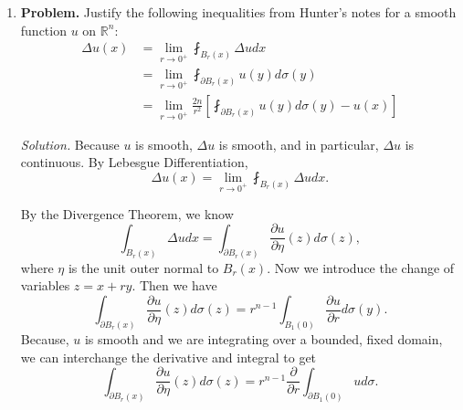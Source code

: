 \documentclass[a4paper]{article}
\newenvironment{solution}{\emph{Solution.}}{}
\newenvironment{problem}{\textbf{Problem.}}{}
\newcommand{\R}{\mathbb{R}}
\begin{document}
\begin{enumerate}
\begin{solution}
      To complete this computation, we make the substitution $y = \ln x$. Then
      \begin{align*}
        \lim_{x \to \infty} x^k u'(x) &= -2 \lim_{y \to \infty} e^{-y^2 + (k-1)y + \ln y} \\
        &= -2 \lim_{y \to \infty} y e^{-y^2 + (k-1)y} \\
        &= 0
      \end{align*}

      Taking further derivatives, similar calculations show $u(x) \in S(R)$.
    \end{solution}

  \item
    \begin{problem}
      Justify the following inequalities from Hunter's notes for a smooth function $u$ on $\R^n$:
      \begin{align*}
        \Delta u(x) &= \lim_{r \to 0^+} \fint_{B_r(x)} \Delta u dx \\
        &= \lim_{r \to 0^+} \fint_{\partial B_r(x)}^{} u(y) d\sigma(y) \\
        &= \lim_{r \to 0^+} \frac{2n}{r^2} \left[ \fint_{\partial B_r(x)}^{} u(y) d\sigma(y) - u(x) \right]
      \end{align*}

    \end{problem}

    \begin{solution}
      Because $u$ is smooth, $\Delta u$ is smooth, and in particular, $\Delta u$ is continuous. By Lebesgue Differentiation,
      \[ \Delta u(x) = \lim_{r \to 0^+} \fint_{B_r(x)}^{} \Delta u dx .\]

      By the Divergence Theorem, we know
      \[ \int_{B_r(x)}^{} \Delta u dx = \int_{\partial B_r(x)}^{} \frac{\partial u}{\partial \eta}(z) d \sigma(z) ,\]
      where $\eta$ is the unit outer normal to $B_r(x)$. Now we introduce the change of variables $z = x+ry$. Then we have
      \[ \int_{\partial B_r(x)}^{} \frac{\partial u}{\partial \eta}(z) d \sigma(z) = r^{n-1} \int_{B_1(0)}^{} \frac{\partial u}{\partial r} d
      \sigma(y) .\]
      Because, $u$ is smooth and we are integrating over a bounded, fixed domain, we can interchange the derivative and integral to get
      \[ \int_{\partial B_r(x)}^{} \frac{\partial u}{\partial \eta}(z) d \sigma(z) = r^{n-1} \frac{\partial}{\partial r} \int_{\partial B_1(0)}^{}
      u d \sigma .\]


\end{solution}
\end{enumerate}
\end{document}
